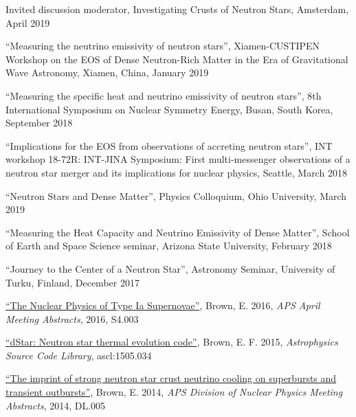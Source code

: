 \documentclass[11pt]{vitae}
\begin{document}
\begin{publist}

\item Invited discussion moderator, Investigating Crusts of Neutron Stars, Amsterdam, April 2019

\item ``Measuring the neutrino emissivity of neutron stars'', Xiamen-CUSTIPEN Workshop on the EOS of Dense Neutron-Rich Matter in the Era of Gravitational Wave Astronomy, Xiamen, China, January 2019

\item ``Measuring the specific heat and neutrino emissivity of neutron stars'', 8th International Symposium on Nuclear Symmetry Energy, Busan, South Korea, September 2018

\item ``Implications for the EOS from observations of accreting neutron stars'', INT workshop 18-72R: INT-JINA Symposium: First multi-messenger observations of a neutron
star merger and its implications for nuclear physics, Seattle, March 2018

\end{publist}


\begin{publist}

\item ``Neutron Stars and Dense Matter'', Physics Colloquium, Ohio University, March 2019

\item ``Measuring the Heat Capacity and Neutrino Emissivity of Dense Matter'', School of Earth and Space Science seminar, Arizona State University, February 2018

\item ``Journey to the Center of a Neutron Star'', Astronomy Seminar, University of Turku, Finland, December 2017

\end{publist}


\begin{publist}

\item \href{https://ui.adsabs.harvard.edu/#abs/2016APS..APR.S4003B/abstract}{``The Nuclear Physics of Type Ia Supernovae''}, Brown, E. 2016, {\itshape APS April Meeting Abstracts}, 2016, S4.003

\item \href{https://ui.adsabs.harvard.edu/#abs/2015ascl.soft05034B/abstract}{``dStar: Neutron star thermal evolution code''}, Brown, E. F. 2015, {\itshape Astrophysics Source Code Library}, ascl:1505.034

\item \href{https://ui.adsabs.harvard.edu/#abs/2014APS..DNP.DL005B/abstract}{``The imprint of strong neutron star crust neutrino cooling on superbursts and transient outbursts''}, Brown, E. 2014, {\itshape APS Division of Nuclear Physics Meeting Abstracts}, 2014, DL.005

\end{publist}
\end{document}
